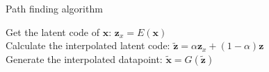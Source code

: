 \documentclass{article} %
\begin{document}
\begin{algorithm}
\caption{Path finding algorithm}
\label{alg:pathFinding}
 Get the latent code of $\bm x$: $\bm z_x = E(\bm x)$ \\
 Calculate the interpolated latent code: $\tilde{\bm z} = \alpha \bm z_x + (1 - \alpha) \bm z$ \\
 Generate the interpolated datapoint: $\tilde{\bm x} = G(\tilde{\bm z})$
\end{algorithm}
\end{document}
